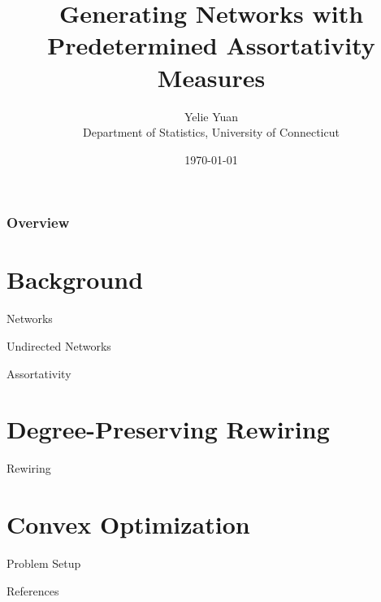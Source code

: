 \documentclass[xcolor=dvipsnames, compress, 10pt]{beamer}
\title{Generating Networks with Predetermined Assortativity Measures}
\author{Yelie Yuan \\
Department of Statistics, University of Connecticut }
\date{\today}
\theoremstyle{remark}
\begin{document}
\frame{\titlepage}

\begin{frame}
	\frametitle{Overview}
	\tableofcontents
\end{frame}


\section{Background}

\begin{frame}{Networks}

	
\end{frame}


\begin{frame}{Undirected Networks}

	
\end{frame}


\begin{frame}{Assortativity}


\end{frame}


\section{Degree-Preserving Rewiring}

\begin{frame}{Rewiring}


\end{frame}


\section{Convex Optimization}

\begin{frame}{Problem Setup}


\end{frame}


\begin{frame}[shrink=20]{References}
	\nocite{Wang2022generating}
	\nocite{Rpkg:wdnet}
	\printbibliography[heading=none]
\end{frame}

\end{document}
